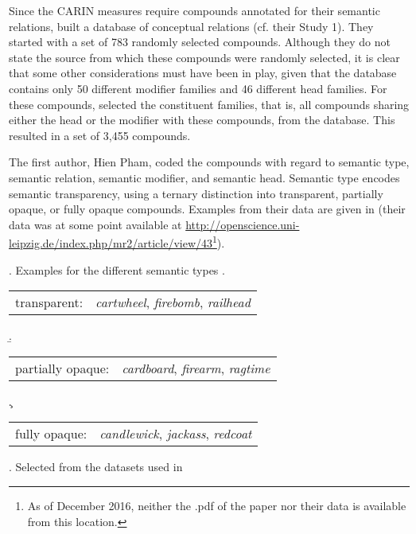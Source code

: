 Since the CARIN measures require compounds annotated for their semantic
relations, \citet{PhamandBaayen:2013} built a database of conceptual
relations (cf. their Study 1).
They started with a set of 783 randomly selected 
compounds. Although they do not state the source from which these compounds were randomly selected, it is clear that some other considerations must have been in play, given that the database contains only 50 different modifier families and 46 different head families. For these compounds, \citeauthor{PhamandBaayen:2013} selected the constituent families, that is,
all compounds sharing either the
head or the modifier with these compounds, from the 
database. This resulted in a set of 3,455 compounds.





The first author, Hien Pham, coded the compounds with regard to
semantic type, semantic relation, semantic modifier, and semantic
head. Semantic type encodes
semantic transparency, using a ternary distinction into transparent, partially opaque, or
fully opaque compounds. Examples from their data are given in \Next
(their data was at some point available at
\url{http://openscience.uni-leipzig.de/index.php/mr2/article/view/43}\footnote{As
of December 2016, neither the .pdf of the paper nor their data is
available from this location.}). 


\ex. Examples for the different semantic types
\a.
\begin{tabular}[t]{p{3cm}p{6cm}}
transparent:& \emph{cartwheel}, \emph{firebomb}, \emph{railhead} 
  \end{tabular}
\b. \begin{tabular}[t]{p{3cm}p{6cm}}
partially opaque:& \emph{cardboard}, \emph{firearm}, \emph{ragtime}
\end{tabular}
\c. \begin{tabular}[t]{p{3cm}p{6cm}}
fully opaque:& \emph{candlewick}, \emph{jackass}, \emph{redcoat }
\end{tabular}
\z. Selected from the datasets used in \citet{PhamandBaayen:2013}

